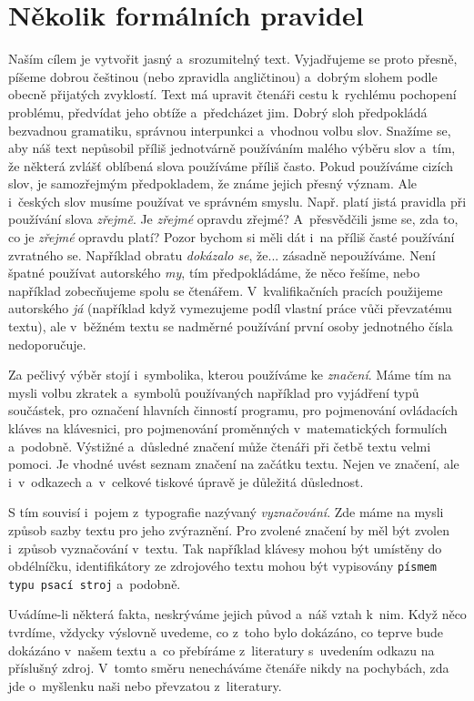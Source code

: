 \chapter{Několik formálních pravidel}
Naším cílem je vytvořit jasný a~srozumitelný text. Vyjadřujeme se proto přesně, píšeme dobrou češtinou (nebo zpravidla angličtinou) a~dobrým slohem podle obecně přijatých zvyklostí. Text má upravit čtenáři cestu k~rychlému pochopení problému, předvídat jeho obtíže a~předcházet jim. Dobrý sloh předpokládá bezvadnou gramatiku, správnou interpunkci a~vhodnou volbu slov. Snažíme se, aby náš text nepůsobil příliš jednotvárně používáním malého výběru slov a~tím, že některá zvlášť oblíbená slova používáme příliš často. Pokud používáme cizích slov, je samozřejmým předpokladem, že známe jejich přesný význam. Ale i~českých slov musíme používat ve správném smyslu. Např. platí jistá pravidla při používání slova {\it zřejmě}. Je {\it zřejmé} opravdu zřejmé? A~přesvědčili jsme se, zda to, co je {\it zřejmé} opravdu platí? Pozor bychom si měli dát i~na příliš časté používání zvratného se. Například obratu {\it dokázalo se}, že... zásadně nepoužíváme. Není špatné používat autorského {\it my}, tím předpokládáme, že něco řešíme, nebo například zobecňujeme spolu se čtenářem. V~kvalifikačních pracích použijeme autorského {\it já} (například když vymezujeme podíl vlastní práce vůči převzatému textu), ale v~běžném textu se nadměrné používání první osoby jednotného čísla nedoporučuje.

Za pečlivý výběr stojí i~symbolika, kterou používáme ke {\it značení}. Máme tím na mysli volbu zkratek a~symbolů používaných například pro vyjádření typů součástek, pro označení hlavních činností programu, pro pojmenování ovládacích kláves na klávesnici, pro pojmenování proměnných v~matematických formulích a~podobně. Výstižné a~důsledné značení může čtenáři při četbě textu velmi pomoci. Je vhodné uvést seznam značení na začátku textu. Nejen ve značení, ale i~v~odkazech a~v~celkové tiskové úpravě je důležitá důslednost.

S tím souvisí i~pojem z~typografie nazývaný {\it vyznačování}. Zde máme na mysli způsob sazby textu pro jeho zvýraznění. Pro zvolené značení by měl být zvolen i~způsob vyznačování v~textu. Tak například klávesy mohou být umístěny do obdélníčku, identifikátory ze zdrojového textu mohou být vypisovány {\tt písmem typu psací stroj} a~podobně.

Uvádíme-li některá fakta, neskrýváme jejich původ a~náš vztah k~nim. Když něco tvrdíme, vždycky výslovně uvedeme, co z~toho bylo dokázáno, co teprve bude dokázáno v~našem textu a~co přebíráme z~literatury s~uvedením odkazu na příslušný zdroj. V~tomto směru nenecháváme čtenáře nikdy na pochybách, zda jde o~myšlenku naši nebo převzatou z~literatury.

